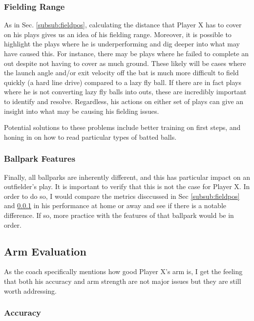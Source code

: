 \documentclass[paper=a4, fontsize=11pt]{scrartcl} %
\begin{document}
\subsubsection{Fielding Range} \label{subsub:fieldrange}

As in Sec. \ref{subsub:fieldpos}, calculating the distance that Player X has to cover on his plays gives us an idea of his fielding range. Moreover, it is possible to highlight the plays where he is underperforming and dig deeper into what may have caused this. For instance, there may be plays where he failed to complete an out despite not having to cover as much ground. These likely will be cases where the launch angle and/or exit velocity off the bat is much more difficult to field quickly (a hard line drive) compared to a lazy fly ball. If there are in fact plays where he is not converting lazy fly balls into outs, these are incredibly important to identify and resolve. Regardless, his actions on either set of plays can give an insight into what may be causing his fielding issues. 

Potential solutions to these problems include better training on first steps, and honing in on how to read particular types of batted balls.

\subsubsection{Ballpark Features}

Finally, all ballparks are inherently different, and this has particular impact on an outfielder's play. It is important to verify that this is not the case for Player X. In order to do so, I would compare the metrics disccussed in Sec \ref{subsub:fieldpos} and \ref{subsub:fieldrange} in his performance at home or away and see if there is a notable difference. If so, more practice with the features of that ballpark would be in order.

\subsection{Arm Evaluation} \label{sub:arm}

As the coach specifically mentions how good Player X's arm is, I get the feeling that both his accuracy and arm strength are not major issues but they are still worth addressing.

\subsubsection{Accuracy}
\end{document}
